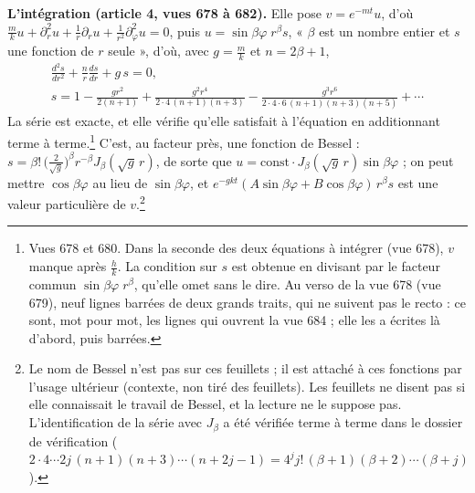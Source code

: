 \documentclass[11pt,a4paper]{article}
\begin{document}
\textbf{L'intégration (article 4, vues 678 à 682).} Elle pose $v = e^{-mt}u$,
d'où $\frac mk u + \partial_r^2 u + \frac1r\partial_r u + \frac{1}{r^2}
\partial_\varphi^2 u = 0$, puis $u = \sin\beta\varphi\;r^\beta s$, « $\beta$
est un nombre entier et $s$ une fonction de $r$ seule », d'où, avec $g =
\frac mk$ et $n = 2\beta + 1$,
\begin{gather*}
\frac{d^2 s}{dr^2} + \frac{n}{r}\frac{ds}{dr} + g\,s = 0, \\
s = 1 - \frac{g r^2}{2(n+1)} + \frac{g^2 r^4}{2\cdot4\,(n+1)(n+3)} -
\frac{g^3 r^6}{2\cdot4\cdot6\,(n+1)(n+3)(n+5)} + \cdots
\end{gather*}
La série est exacte, et elle vérifie qu'elle satisfait à l'équation en
additionnant terme à terme.\footnote{Vues 678 et 680. Dans la seconde des deux
équations à intégrer (vue 678), $v$ manque après $\frac hk$. La condition sur
$s$ est obtenue en divisant par le facteur commun $\sin\beta\varphi\;r^\beta$,
qu'elle omet sans le dire. Au verso de la vue 678 (vue 679), neuf lignes
barrées de deux grands traits, qui ne suivent pas le recto : ce sont, mot pour
mot, les lignes qui ouvrent la vue 684 ; elle les a écrites là d'abord, puis
barrées.} C'est, au facteur près, une fonction de Bessel : $s =
\beta!\,\big(\frac{2}{\sqrt g}\big)^{\beta} r^{-\beta} J_\beta(\sqrt g\,r)$, de
sorte que $u = \text{const}\cdot J_\beta(\sqrt g\,r)\sin\beta\varphi$ ; on peut
mettre $\cos\beta\varphi$ au lieu de $\sin\beta\varphi$, et $e^{-gkt}(A\sin
\beta\varphi + B\cos\beta\varphi)\,r^\beta s$ est une valeur particulière de
$v$.\footnote{Le nom de Bessel n'est pas sur ces feuillets ; il est attaché à
ces fonctions par l'usage ultérieur (contexte, non tiré des feuillets). Les
feuillets ne disent pas si elle connaissait le travail de Bessel, et la lecture
ne le suppose pas. L'identification de la série avec $J_\beta$ a été vérifiée
terme à terme dans le dossier de vérification ($2\cdot4\cdots2j\,(n+1)(n+3)
\cdots(n+2j-1) = 4^j j!\,(\beta+1)(\beta+2)\cdots(\beta+j)$).}
\end{document}
